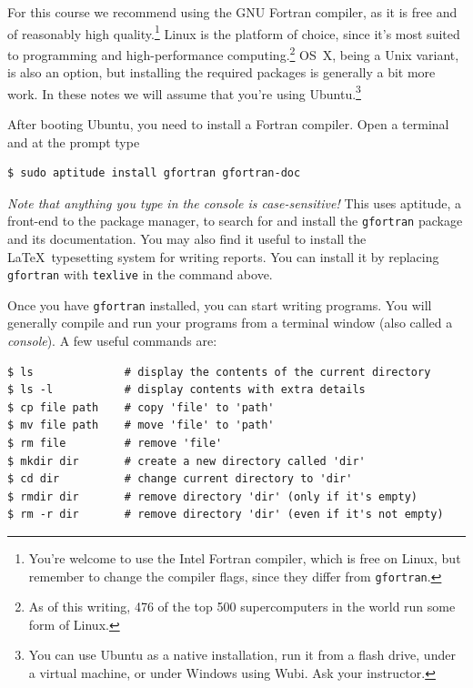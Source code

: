 \documentclass[openany,oneside]{report}
\begin{document}
For this course we recommend using the GNU Fortran compiler, as it is free and of reasonably high quality.\footnote{You're welcome to use the Intel Fortran compiler, which is free on Linux, but remember to change the compiler flags, since they differ from \texttt{gfortran}.} 
Linux is the platform of choice, since it's most suited to programming and high-performance computing.\footnote{As of this writing, 476 of the top 500 supercomputers in the world run some form of Linux.}
OS~X, being a Unix variant, is also an option, but installing the required packages is generally a bit more work.
In these notes we will assume that you're using Ubuntu.\footnote{You can use Ubuntu as a native installation, run it from a flash drive, under a virtual machine, or under Windows using Wubi.
Ask your instructor.}

After booting Ubuntu, you need to install a Fortran compiler.
Open a terminal and at the prompt type
\begin{verbatim}
$ sudo aptitude install gfortran gfortran-doc
\end{verbatim}
\emph{Note that anything you type in the console is case-sensitive!} 
This uses aptitude, a front-end to the package manager, to search for and install the \texttt{gfortran} package and its documentation.
You may also find it useful to install the \LaTeX\ typesetting system for writing reports.
You can install it by replacing \texttt{gfortran} with \texttt{texlive} in the command above.

Once you have \texttt{gfortran} installed, you can start writing programs.
You will generally compile and run your programs from a terminal window (also called a \emph{console}).
A few useful commands are:
\begin{verbatim}
$ ls              # display the contents of the current directory
$ ls -l           # display contents with extra details
$ cp file path    # copy 'file' to 'path'
$ mv file path    # move 'file' to 'path'
$ rm file         # remove 'file'
$ mkdir dir       # create a new directory called 'dir'
$ cd dir          # change current directory to 'dir'
$ rmdir dir       # remove directory 'dir' (only if it's empty)
$ rm -r dir       # remove directory 'dir' (even if it's not empty)
\end{verbatim}
\end{document}
